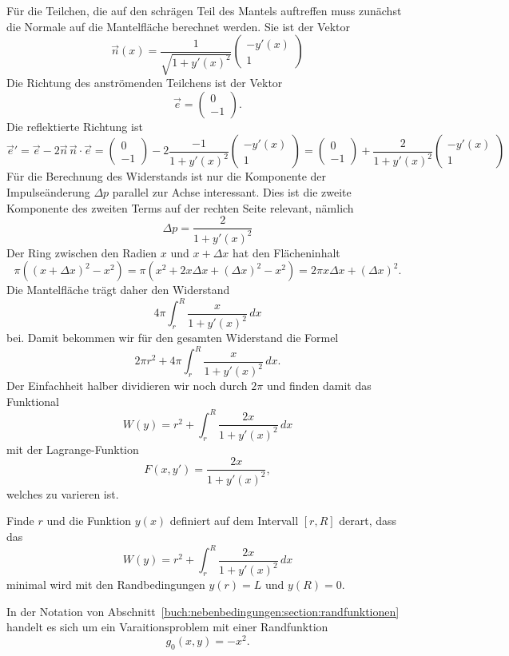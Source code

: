 Für die Teilchen, die auf den schrägen Teil des Mantels auftreffen
muss zunächst die Normale auf die Mantelfläche berechnet werden.
Sie ist der Vektor
\[
\vec{n}(x)
=
\frac{1}{\sqrt{1+y'(x)^2}}
\begin{pmatrix}
-y'(x)\\
1
\end{pmatrix}
\]
Die Richtung des anströmenden Teilchens ist der Vektor
\[
\vec{e}
=
\begin{pmatrix}
 0\\
-1
\end{pmatrix}.
\]
Die reflektierte Richtung ist
\[
\vec{e}'
=
\vec{e}
-2\vec{n}\,\vec{n}\cdot\vec{e}
=
\begin{pmatrix} 0\\ -1 \end{pmatrix}
-2
\frac{-1}{1+y'(x)^2}
\begin{pmatrix}
-y'(x)\\
1
\end{pmatrix}
=
\begin{pmatrix}0\\-1\end{pmatrix}
+
\frac{2}{1+y'(x)^2}\begin{pmatrix}-y'(x)\\1\end{pmatrix}
\]
Für die Berechnung des Widerstands ist nur die Komponente der
Impulseänderung $\Delta p$ parallel zur Achse interessant.
Dies ist die zweite Komponente des zweiten Terms auf der rechten
Seite relevant, nämlich
\[
\Delta p
=
\frac{2}{1+y'(x)^2}
\]
Der Ring zwischen den Radien $x$ und $x+\Delta x$ hat den Flächeninhalt
\[
\pi ((x+\Delta x)^2 - x^2)
=
\pi (x^2 +2x\Delta x + (\Delta x)^2 - x^2)
=
2\pi x \Delta x + (\Delta x)^2.
\]
Die Mantelfläche trägt daher den Widerstand
\begin{equation*}
4\pi
\int_{r}^{R}
\frac{x}{1+y'(x)^2}\,dx
\end{equation*}
bei.
Damit bekommen wir für den gesamten Widerstand die Formel
\[
2\pi r^2 + 4\pi \int_r^R \frac{x}{1+y'(x)^2}\,dx.
\]
Der Einfachheit halber dividieren wir noch durch $2\pi$ und finden
damit das Funktional
\begin{equation}
W(y)
=
r^2 
+
\int_r^R \frac{2x}{1+y'(x)^2}\,dx
\end{equation}
mit der Lagrange-Funktion
\[
F(x,y')
=
\frac{2x}{1+y'(x)^2},
\]
welches zu varieren ist.

\begin{aufgabe}
\label{widerstand:aufgabe}
Finde $r$ und die Funktion $y(x)$ definiert auf dem Intervall $[r,R]$
derart, dass das
\begin{equation}
W(y)
=
r^2
+
\int_r^R \frac{2x}{1+y'(x)^2}\,dx
\label{widerstand:eqn:Wy}
\end{equation}
minimal wird mit den Randbedingungen
$y(r)=L$ und $y(R)=0$.
\end{aufgabe}

In der Notation von
Abschnitt~\ref{buch:nebenbedingungen:section:randfunktionen}
handelt es sich um ein Varaitionsproblem mit einer Randfunktion
\begin{equation}
g_0(x,y) = -x^2.
\label{widerstand:eqn:randfunktion}
\end{equation}



